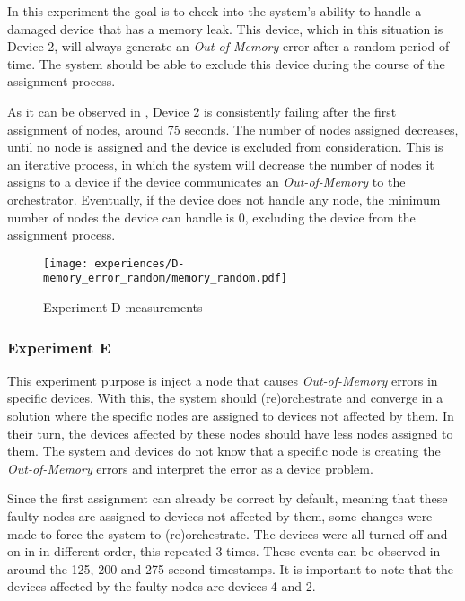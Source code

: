 In this experiment the goal is to check into the system's ability to handle a damaged device that has a memory leak. This device, which in this situation is Device 2, will always generate an \textit{Out-of-Memory} error after a random period of time. The system should be able to exclude this device during the course of the assignment process.

As it can be observed in , Device 2 is consistently failing after the first assignment of nodes, around 75 seconds. The number of nodes assigned decreases, until no node is assigned and the device is excluded from consideration. This is an iterative process, in which the system will decrease the number of nodes it assigns to a device if the device communicates an \textit{Out-of-Memory} to the orchestrator. Eventually, if the device does not handle any node, the minimum number of nodes the device can handle is 0, excluding the device from the assignment process.

\begin{figure}[h]
\centering
\texttt{[image: experiences/D-memory\_error\_random/memory\_random.pdf]}
\caption[Experiment D measurements]{Experiment D measurements}\label{fig:experiment_d_graph}
\end{figure}


\subsubsection{Experiment E}

This experiment purpose is inject a node that causes \textit{Out-of-Memory} errors in specific devices. With this, the system should (re)orchestrate and converge in a solution where the specific nodes are assigned to devices not affected by them. In their turn, the devices affected by these nodes should have less nodes assigned to them. The system and devices do not know that a specific node is creating the \textit{Out-of-Memory} errors and interpret the error as a device problem.

Since the first assignment can already be correct by default, meaning that these faulty nodes are assigned to devices not affected by them, some changes were made to force the system to (re)orchestrate. The devices were all turned off and on in in different order, this repeated 3 times. These events can be observed in  around the 125, 200 and 275 second timestamps. It is important to note that the devices affected by the faulty nodes are devices 4 and 2.

